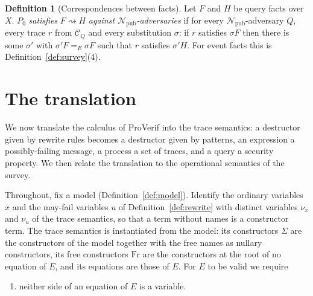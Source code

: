 \documentclass[11pt]{article}
\theoremstyle{definition}
\newtheorem{definition}{Definition}[section]
\theoremstyle{plain}
\theoremstyle{remark}
\newcommand{\Fr}{\mathrm{Fr}}
\begin{document}
\begin{definition}[Correspondences between facts]\label{def:corr-facts}
Let $F$ and $H$ be query facts over $X$. $P_0$ \textit{satisfies} $F\rightsquigarrow H$ \textit{against $\mathcal{N}_{\mathrm{pub}}$-adversaries} if for every $\mathcal{N}_{\mathrm{pub}}$-adversary $Q$, every trace $r$ from $\mathcal{C}_Q$ and every substitution $\sigma$: if $r$ satisfies $\sigma F$ then there is some $\sigma'$ with $\sigma'F=_E\sigma F$ such that $r$ satisfies $\sigma'H$. For event facts this is Definition~\ref{def:survey}(4).
\end{definition}

\section{The translation}

We now translate the calculus of ProVerif into the trace semantics: a destructor given by rewrite rules becomes a destructor given by patterns, an expression a possibly-failing message, a process a set of traces, and a query a security property. We then relate the translation to the operational semantics of the survey.

Throughout, fix a model (Definition~\ref{def:model}). Identify the ordinary variables $x$ and the may-fail variables $u$ of Definition~\ref{def:rewrite} with distinct variables $\nu_x$ and $\nu_u$ of the trace semantics, so that a term without names is a constructor term. The trace semantics is instantiated from the model: its constructors $\Sigma$ are the constructors of the model together with the free names as nullary constructors, its free constructors $\Fr$ are the constructors at the root of no equation of $E$, and its equations are those of $E$. For $E$ to be valid we require
\begin{enumerate}
\item[(R1)] neither side of an equation of $E$ is a variable.
\end{enumerate}
\end{document}
